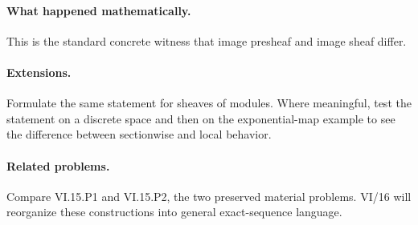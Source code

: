 \paragraph{What happened mathematically.}
This is the standard concrete witness that image presheaf and image sheaf differ.

\paragraph{Extensions.}
Formulate the same statement for sheaves of modules.  Where meaningful, test the statement on a discrete space and then on the exponential-map example to see the difference between sectionwise and local behavior.

\paragraph{Related problems.}
Compare VI.15.P1 and VI.15.P2, the two preserved material problems.  VI/16 will reorganize these constructions into general exact-sequence language.
\fi
